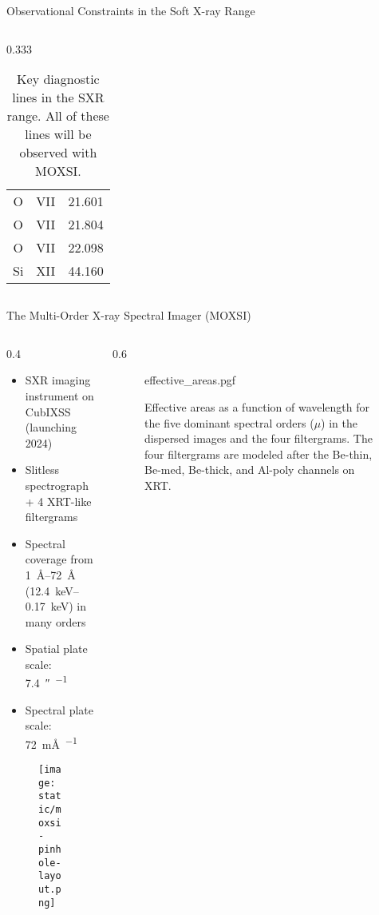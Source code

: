 \documentclass[final]{beamer}
\newlength{\colwidth}
\begin{document}
\begin{frame}[t]
\begin{columns}[t]
\begin{column}{\colwidth}
\begin{block}{Observational Constraints in the Soft X-ray Range}
\begin{columns}[c]
\begin{column}{0.333\colwidth}
\begin{table}
\begin{tabular}{ccc}
            O & VII & 21.601 \\
            O & VII & 21.804 \\
            O & VII & 22.098 \\
            Si & XII & 44.160 \\
            \bottomrule
          \end{tabular}
          \caption{Key diagnostic lines in the SXR range. All of these lines will be observed with MOXSI.}
          \label{tab:line_table}
        \end{table}
      \end{column}
    \end{columns}

  \end{block}

  \begin{block}{The Multi-Order X-ray Spectral Imager (MOXSI)}


    \begin{columns}[t]
      \begin{column}{0.4\colwidth}
        \begin{itemize}
          \item SXR imaging instrument on \alert{CubIXSS (launching 2024)}
          \item \alert{Slitless spectrograph} + 4 XRT-like filtergrams
          \item Spectral coverage from \alert{\SIrange{1}{72}{\angstrom}} (\SIrange{12.4}{0.17}{\kilo\eV}) in many orders
          \item Spatial plate scale: \SI{7.4}{\arcsecond\per\pixel}
          \item Spectral plate scale: \SI{72}{\milli\angstrom\per\pixel}
        \end{itemize}
        \begin{figure}
          \centering
          \texttt{[image: static/moxsi-pinhole-layout.png]}
        \end{figure}
      \end{column}
      \begin{column}{0.6\colwidth}
        \begin{figure}
          \centering
          {effective_areas.pgf}
          \caption{Effective areas as a function of wavelength for the five dominant spectral orders ($\mu$) in the dispersed images and the four filtergrams. The four filtergrams are modeled after the Be-thin, Be-med, Be-thick, and Al-poly channels on XRT.}
          \label{fig:effective_areas}
        \end{figure}
      \end{column}
    \end{columns}


\end{block}
\end{column}
\end{columns}
\end{frame}
\end{document}

